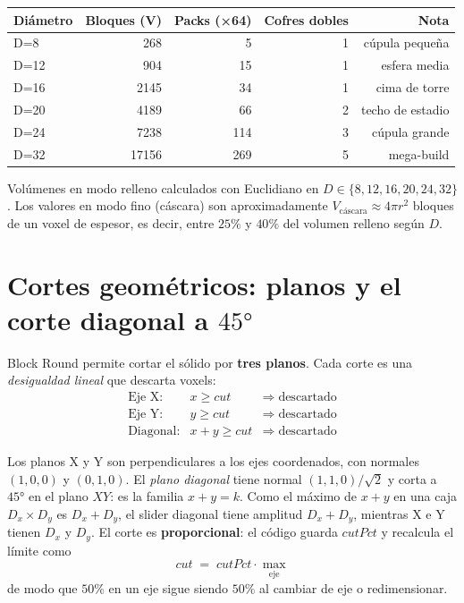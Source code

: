 \documentclass[12pt,a4paper]{scrartcl}
\newcommand{\acc}[1]{\textcolor{accent}{\textbf{#1}}}
\begin{document}
\vspace{0.5em}
\begin{center}
\begin{tabular}{@{}lrrrr@{}}
\toprule
\textbf{Diámetro} & \textbf{Bloques (V)} & \textbf{Packs (×64)} & \textbf{Cofres dobles} & \textbf{Nota} \\
\midrule
D=8   &   268 &  5  & 1 & cúpula pequeña  \\
D=12  &   904 & 15  & 1 & esfera media \\
D=16  &  2145 & 34  & 1 & cima de torre \\
D=20  &  4189 & 66  & 2 & techo de estadio \\
D=24  &  7238 & 114 & 3 & cúpula grande \\
D=32  & 17156 & 269 & 5 & mega-build \\
\bottomrule
\end{tabular}
\end{center}

Volúmenes en modo relleno calculados con Euclidiano en $D \in \{8,12,16,20,24,32\}$. Los valores en modo fino (cáscara) son aproximadamente $V_{\mathrm{cáscara}} \approx 4\pi r^2$ bloques de un voxel de espesor, es decir, entre $25\%$ y $40\%$ del volumen relleno según $D$.

\section{Cortes geométricos: planos y el corte diagonal a $45°$}

Block Round permite cortar el sólido por \acc{tres planos}. Cada corte es una \emph{desigualdad lineal} que descarta voxels:
\[
\begin{array}{lcl}
\text{Eje X:}    & x \geq \mathit{cut}      & \Rightarrow\; \text{descartado} \\
\text{Eje Y:}    & y \geq \mathit{cut}      & \Rightarrow\; \text{descartado} \\
\text{Diagonal:}  & x + y \geq \mathit{cut}  & \Rightarrow\; \text{descartado}
\end{array}
\]

Los planos X y Y son perpendiculares a los ejes coordenados, con normales $(1,0,0)$ y $(0,1,0)$. El \emph{plano diagonal} tiene normal $(1,1,0)/\sqrt{2}$ y corta a $45°$ en el plano $XY$: es la familia $x+y = k$. Como el máximo de $x+y$ en una caja $D_x \times D_y$ es $D_x + D_y$, el slider diagonal tiene amplitud $D_x + D_y$, mientras X e Y tienen $D_x$ y $D_y$. El corte es \acc{proporcional}: el código guarda $\mathit{cutPct}$ y recalcula el límite como
\[
\mathit{cut} \;=\; \mathit{cutPct} \cdot \max_{\text{eje}}
\]
de modo que $50\%$ en un eje sigue siendo $50\%$ al cambiar de eje o redimensionar.
\end{document}
